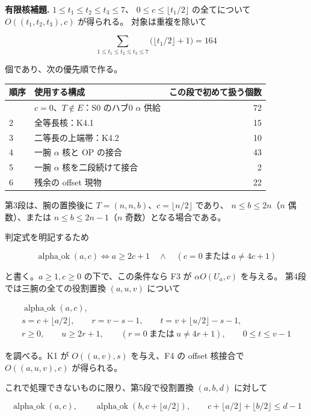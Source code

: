 \documentclass[
  10pt,
  a4paper,
]{article}
\begin{document}
\textbf{有限核補題.} \(1\le t_1\le t_2\le t_3\le7\)、
\(0\le c\le\lfloor t_1/2\rfloor\) の全てについて \(O((t_1,t_2,t_3),c)\)
が得られる。 対象は重複を除いて

\[
\sum_{1\le t_1\le t_2\le t_3\le7}
\bigl(\lfloor t_1/2\rfloor+1\bigr)=164
\]

個であり、次の優先順で作る。

\begin{longtable}[]{@{}llr@{}}
\toprule\noalign{}
順序 & 使用する構成 & この段で初めて扱う個数 \\
\midrule\noalign{}
\endhead
\bottomrule\noalign{}
\endlastfoot
1 & \(c=0\)、\(T\notin E\)：S0 のハブ0 \(\alpha\) 供給 & 72 \\
2 & 全等長核：K4.1 & 15 \\
3 & 二等長の上端帯：K4.2 & 10 \\
4 & 一腕 \(\alpha\) 核と OP の接合 & 43 \\
5 & 一腕 \(\alpha\) 核を二段続けて接合 & 2 \\
6 & 残余の offset 現物 & 22 \\
\end{longtable}

第3段は、腕の置換後に \(T=(n,n,b)\)、\(c=\lfloor n/2\rfloor\) であり、
\(n\le b\le2n\)（\(n\) 偶数）、または \(n\le b\le2n-1\)（\(n\)
奇数）となる場合である。

判定式を明記するため

\[
\operatorname{alpha\_ok}(a,c)\iff
 a\ge2c+1\quad\land\quad(c=0\ \text{または}\ a\ne4c+1)
\]

と書く。\(a\ge1,c\ge0\) の下で、この条件なら F3 が \(\alpha O(U_a,c)\)
を与える。 第4段では三腕の全ての役割置換 \((a,u,v)\) について

\[
\begin{gathered}
\operatorname{alpha\_ok}(a,c),\\
s=c+\lfloor a/2\rfloor,\qquad r=v-s-1,\qquad
 t=v+\lfloor u/2\rfloor-s-1,\\
r\ge0,\qquad u\ge2r+1,\qquad
(r=0\ \text{または}\ u\ne4r+1),\qquad 0\le t\le v-1
\end{gathered}
\]

を調べる。K1 が \(O((u,v),s)\) を与え、F4 の offset 核接合で
\(O((a,u,v),c)\) が得られる。

これで処理できないものに限り、第5段で役割置換 \((a,b,d)\) に対して

\[
\operatorname{alpha\_ok}(a,c),\qquad
\operatorname{alpha\_ok}(b,c+\lfloor a/2\rfloor),\qquad
c+\lfloor a/2\rfloor+\lfloor b/2\rfloor\le d-1
\]
\end{document}
